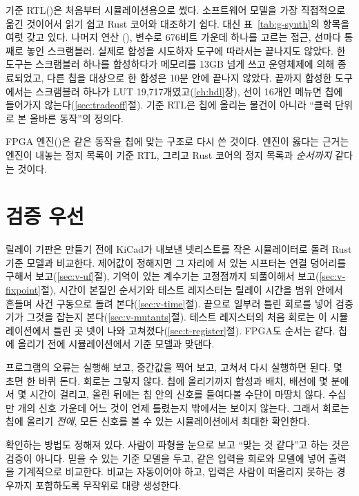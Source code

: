 기준 RTL()은 처음부터 시뮬레이션용으로 썼다. 소프트웨어 모델을 가장 직접적으로 옮긴 것이어서
읽기 쉽고 Rust 코어와 대조하기 쉽다. 대신 표~\ref{tab:g-synth}의 항목을 여럿 갖고 있다. 나머지 연산
(), 변수로 676비트 가운데 하나를 고르는 접근, 선마다 통째로 놓인 스크램블러.
실제로 합성을 시도하자 도구에 따라서는 끝나지도 않았다. 한 도구는 스크램블러 하나를 합성하다가
메모리를 13GB 넘게 쓰고 운영체제에 의해 종료되었고, 다른 칩을 대상으로 한 합성은 10분 안에 끝나지
않았다. 끝까지 합성한 도구에서는 스크램블러 하나가 LUT 19,717개였고(\ref{ch:hdl}장), 선이 16개인 메뉴면 칩에
들어가지 않는다(\ref{sec:tradeoff}절). 기준 RTL은 칩에 올리는 물건이 아니라 ``클럭 단위로 본 올바른 동작''의 정의다.

FPGA 엔진()은 같은 동작을 칩에 맞는 구조로 다시 쓴 것이다. 엔진이 옳다는 근거는 엔진이
내놓는 정지 목록이 기준 RTL, 그리고 Rust 코어의 정지 목록과 \emph{순서까지} 같다는 것이다.

\section{검증 우선}

\Relay 릴레이 기판은 만들기 전에 KiCad가 내보낸 넷리스트를 작은 시뮬레이터로 돌려 Rust 기준 모델과 비교한다.
제어값이 정해지면 그 자리에 서 있는 시프터는 연결 덩어리를 구해서 보고(\ref{sec:v-uf}절), 기억이 있는 계수기는
고정점까지 되풀이해서 보고(\ref{sec:v-fixpoint}절), 시간이 본질인 순서기와 테스트 레지스터는 릴레이 시간을
범위 안에서 흔들며 사건 구동으로 돌려 본다(\ref{sec:v-time}절). 끝으로 일부러 틀린 회로를 넣어 검증기가 그것을
잡는지 본다(\ref{sec:v-mutants}절). 테스트 레지스터의 처음 회로는 이 시뮬레이션에서 틀린 곳 넷이 나와
고쳐졌다(\ref{sec:t-register}절). FPGA도 순서는 같다. 칩에 올리기 전에 시뮬레이션에서 기준 모델과 맞댄다.

\Why 프로그램의 오류는 실행해 보고, 중간값을 찍어 보고, 고쳐서 다시 실행하면 된다. 몇 초면 한 바퀴 돈다.
회로는 그렇지 않다. 칩에 올리기까지 합성과 배치, 배선에 몇 분에서 몇 시간이 걸리고, 올린 뒤에는 칩 안의
신호를 들여다볼 수단이 마땅치 않다. 수십만 개의 신호 가운데 어느 것이 언제 틀렸는지 밖에서는 보이지 않는다.
그래서 회로는 칩에 올리기 \emph{전에}, 모든 신호를 볼 수 있는 시뮬레이션에서 최대한 확인한다.

확인하는 방법도 정해져 있다. 사람이 파형을 눈으로 보고 ``맞는 것 같다''고 하는 것은 검증이 아니다.
믿을 수 있는 기준 모델을 두고, 같은 입력을 회로와 모델에 넣어 출력을 기계적으로 비교한다. 비교는 자동이어야
하고, 입력은 사람이 떠올리지 못하는 경우까지 포함하도록 무작위로 대량 생성한다.


